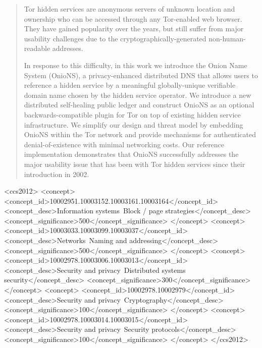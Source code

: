 \documentclass{sig-alternate}
\begin{document}
\begin{abstract}
Tor hidden services are anonymous servers of unknown location and ownership who can be accessed through any Tor-enabled web browser. They have gained popularity over the years, but still suffer from major usability challenges due to the cryptographically-generated non-human-readable addresses.

In response to this difficulty, in this work we introduce the Onion Name System (OnioNS), a privacy-enhanced distributed DNS that allows users to reference a hidden service by a meaningful globally-unique verifiable domain name chosen by the hidden service operator. We introduce a new distributed self-healing public ledger and construct OnioNS as an optional backwards-compatible plugin for Tor on top of existing hidden service infrastructure. We simplify our design and threat model by embedding OnioNS within the Tor network and provide mechanisms for authenticated denial-of-existence with minimal networking costs. Our reference implementation demonstrates that OnioNS successfully addresses the major usability issue that has been with Tor hidden services since their introduction in 2002.

\end{abstract}

\begin{CCSXML}
<ccs2012>
<concept>
<concept_id>10002951.10003152.10003161.10003164</concept_id>
<concept_desc>Information systems~Block / page strategies</concept_desc>
<concept_significance>500</concept_significance>
</concept>
<concept>
<concept_id>10003033.10003099.10003037</concept_id>
<concept_desc>Networks~Naming and addressing</concept_desc>
<concept_significance>500</concept_significance>
</concept>
<concept>
<concept_id>10002978.10003006.10003013</concept_id>
<concept_desc>Security and privacy~Distributed systems security</concept_desc>
<concept_significance>300</concept_significance>
</concept>
<concept>
<concept_id>10002978.10002979</concept_id>
<concept_desc>Security and privacy~Cryptography</concept_desc>
<concept_significance>100</concept_significance>
</concept>
<concept>
<concept_id>10002978.10003014.10003015</concept_id>
<concept_desc>Security and privacy~Security protocols</concept_desc>
<concept_significance>100</concept_significance>
</concept>
</ccs2012>
\end{CCSXML}
\end{document}
